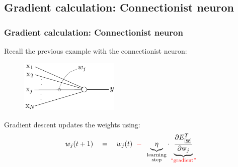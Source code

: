 \subsection{Gradient calculation: Connectionist neuron}

\begin{frame}\frametitle{Gradient calculation: Connectionist neuron}
    
    Recall the previous example with the connectionist neuron:
    
    \begin{figure}[h]
        \centering
        \includegraphics[height=2.5cm]{img/linearNeuron_y}
        \label{fig:neuron} 
    \end{figure}
    
    Gradient descent updates the weights using:
    \begin{equation}
    		w_{j}(t+1) \quad=\quad w_{j}(t) 
				\;\;{\color{red}-}\;\;
				\underbrace{{\eta}}_{ 
						\substack{\text{learning} \\ \text{step} } }
                        \cdot
				\underbrace{\frac{\partial {E}^T_{[\underline{\mathbf{w}}]}}{
					\partial \mathrm{w}_{j}}}_{
						\substack{
							\text{\textcolor{red}{``gradient''}} 
			} }
    \end{equation}
    
\end{frame}

